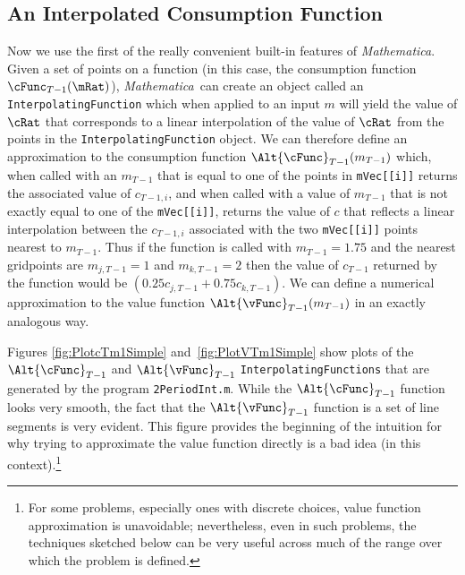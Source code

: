 \documentclass[titlepage]{\econtex}
\newcommand{\Mma}{\textit{Mathematica}}
\begin{document}
\subsection{An Interpolated Consumption Function} \label{subsec:LinInterp}

Now we use the first of the really convenient built-in features of
 {\Mma}.
Given a set of points on a function (in this case, the consumption
function $\cFunc_{T-1}(\mRat)$), {\Mma}~can create an object
called an \texttt{InterpolatingFunction} which when applied to an
input ${m}$ will yield the value of $\cRat$ that corresponds to a
linear interpolation of the value of $\cRat$ from the points in the
\texttt{InterpolatingFunction} object.  We can therefore define an 
approximation to the consumption function $\Alt{\cFunc}_{T-1}({m}_{T-1})$ which, when called with an
${m}_{T-1}$ that is equal to one of the points in
\texttt{mVec[[i]]} returns the associated value of
${c}_{T-1,i}$, and when called with a value of ${m}_{T-1}$ that
is not exactly equal to one of the \texttt{mVec[[i]]}, returns
the value of ${c}$ that reflects a linear interpolation between the
${c}_{T-1,i}$ associated with the two \texttt{mVec[[i]]}
points nearest to ${m}_{T-1}$.  Thus if the function is called with
${m}_{T-1} = 1.75$ and the nearest gridpoints
 are ${m}_{j,T-1}=1$ and
${m}_{k,T-1}=2$ then the value of ${c}_{T-1}$ returned by the
function would be $(0.25 {c}_{j,T-1}+0.75 {c}_{k,T-1})$. We
can define a numerical approximation to the value function
$\Alt{\vFunc}_{T-1}({m}_{T-1})$ in an exactly analogous way.


Figures \ref{fig:PlotcTm1Simple} and~\ref{fig:PlotVTm1Simple} show
plots of the $\Alt{\cFunc}_{T-1}$ and $\Alt{\vFunc}_{T-1}$
\texttt{InterpolatingFunctions} that are generated by the program
\texttt{2PeriodInt.m}.  While the $\Alt{\cFunc}_{T-1}$ function looks
very smooth, the fact that the $\Alt{\vFunc}_{T-1}$ function is a set
of line segments is very evident.  This figure provides the beginning
of the intuition for why trying to approximate the value function
directly is a bad idea (in this context).\footnote{For some problems,
  especially ones with discrete choices, value function approximation is unavoidable;
  nevertheless, even in such problems, the techniques sketched below can
  be very useful across much of the range over which the problem is defined.}
\end{document}
